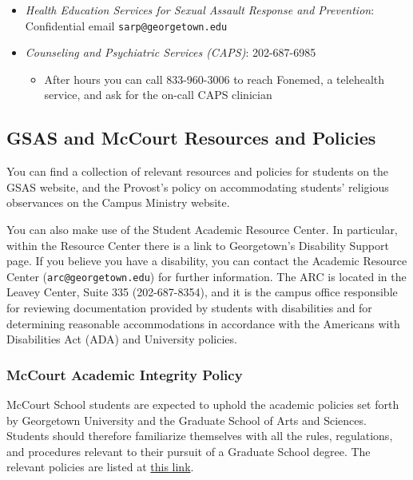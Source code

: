 \documentclass[
]{scrartcl}
\providecommand{\tightlist}{%
  \setlength{\itemsep}{0pt}\setlength{\parskip}{0pt}}\usepackage{longtable,booktabs,array}
\begin{document}
\begin{itemize}
\tightlist
\item
  \emph{Health Education Services for Sexual Assault Response and
  Prevention}: Confidential email \texttt{sarp@georgetown.edu}
\item
  \emph{Counseling and Psychiatric Services (CAPS)}: 202-687-6985

  \begin{itemize}
  \tightlist
  \item
    After hours you can call 833-960-3006 to reach Fonemed, a telehealth
    service, and ask for the on-call CAPS clinician
  \end{itemize}
\end{itemize}

\subsection{GSAS and McCourt Resources and
Policies}\label{gsas-and-mccourt-resources-and-policies}

You can find a collection of relevant resources and policies for
students on the GSAS website, and the Provost's policy on accommodating
students' religious observances on the Campus Ministry website.

You can also make use of the Student Academic Resource Center. In
particular, within the Resource Center there is a link to Georgetown's
Disability Support page. If you believe you have a disability, you can
contact the Academic Resource Center (\texttt{arc@georgetown.edu}) for
further information. The ARC is located in the Leavey Center, Suite 335
(202-687-8354), and it is the campus office responsible for reviewing
documentation provided by students with disabilities and for determining
reasonable accommodations in accordance with the Americans with
Disabilities Act (ADA) and University policies.

\subsubsection{McCourt Academic Integrity
Policy}\label{mccourt-academic-integrity-policy}

McCourt School students are expected to uphold the academic policies set
forth by Georgetown University and the Graduate School of Arts and
Sciences. Students should therefore familiarize themselves with all the
rules, regulations, and procedures relevant to their pursuit of a
Graduate School degree. The relevant policies are listed at
\href{https://sites.google.com/a/georgetown.edu/gsas-graduate-bulletin/vi-academic-integrity-policies-procedures}{this
link}.
\end{document}
